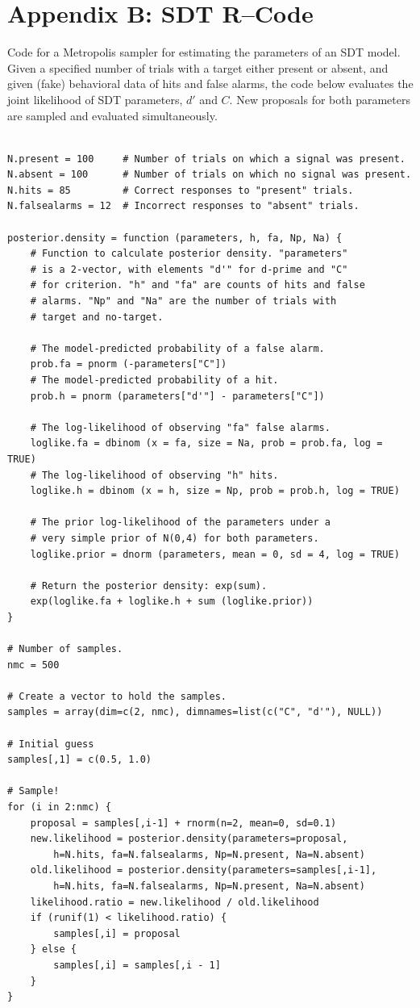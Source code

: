 \section*{Appendix B: SDT R--Code}

Code for a Metropolis sampler for estimating the parameters of an SDT model. Given a specified number of trials with a target either present or absent, and given (fake) behavioral data of hits and false alarms, the code below evaluates the joint likelihood of SDT parameters, $d'$ and $C$. New proposals for both parameters are sampled and evaluated simultaneously. 

\begin{verbatim}

N.present = 100     # Number of trials on which a signal was present.
N.absent = 100      # Number of trials on which no signal was present.
N.hits = 85         # Correct responses to "present" trials.
N.falsealarms = 12  # Incorrect responses to "absent" trials.

posterior.density = function (parameters, h, fa, Np, Na) {
    # Function to calculate posterior density. "parameters"
    # is a 2-vector, with elements "d'" for d-prime and "C"
    # for criterion. "h" and "fa" are counts of hits and false
    # alarms. "Np" and "Na" are the number of trials with
    # target and no-target.

    # The model-predicted probability of a false alarm.
    prob.fa = pnorm (-parameters["C"])
    # The model-predicted probability of a hit.
    prob.h = pnorm (parameters["d'"] - parameters["C"])

    # The log-likelihood of observing "fa" false alarms.
    loglike.fa = dbinom (x = fa, size = Na, prob = prob.fa, log = TRUE)
    # The log-likelihood of observing "h" hits.
    loglike.h = dbinom (x = h, size = Np, prob = prob.h, log = TRUE)

    # The prior log-likelihood of the parameters under a 
    # very simple prior of N(0,4) for both parameters.
    loglike.prior = dnorm (parameters, mean = 0, sd = 4, log = TRUE)

    # Return the posterior density: exp(sum).
    exp(loglike.fa + loglike.h + sum (loglike.prior))
}

# Number of samples.
nmc = 500

# Create a vector to hold the samples.
samples = array(dim=c(2, nmc), dimnames=list(c("C", "d'"), NULL))

# Initial guess
samples[,1] = c(0.5, 1.0)

# Sample!
for (i in 2:nmc) {
    proposal = samples[,i-1] + rnorm(n=2, mean=0, sd=0.1)
    new.likelihood = posterior.density(parameters=proposal, 
        h=N.hits, fa=N.falsealarms, Np=N.present, Na=N.absent)
    old.likelihood = posterior.density(parameters=samples[,i-1], 
        h=N.hits, fa=N.falsealarms, Np=N.present, Na=N.absent)
    likelihood.ratio = new.likelihood / old.likelihood
    if (runif(1) < likelihood.ratio) {
        samples[,i] = proposal
    } else {
        samples[,i] = samples[,i - 1]
    }
}

\end{verbatim}

